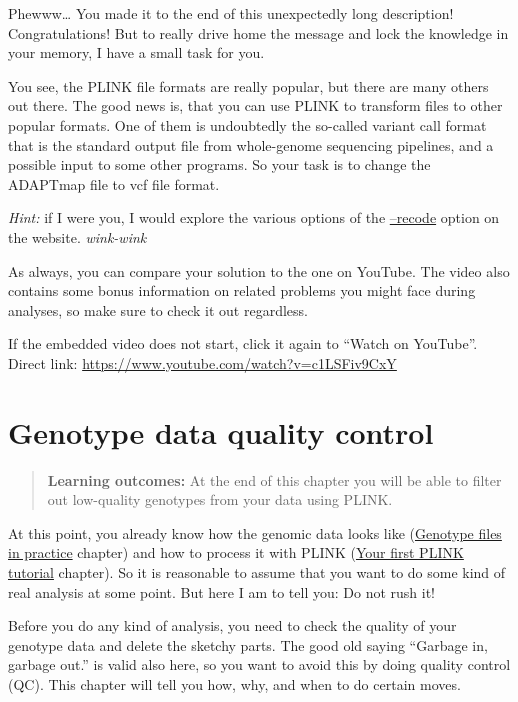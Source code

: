 \documentclass[]{book}
\begin{document}
Phewww\ldots{} You made it to the end of this unexpectedly long
description! Congratulations! But to really drive home the message and
lock the knowledge in your memory, I have a small task for you.

You see, the PLINK file formats are really popular, but there are many
others out there. The good news is, that you can use PLINK to transform
files to other popular formats. One of them is undoubtedly the so-called
variant call format that is the standard output file from whole-genome
sequencing pipelines, and a possible input to some other programs. So
your task is to change the ADAPTmap file to vcf file format.

\emph{Hint:} if I were you, I would explore the various options of the
\href{https://www.cog-genomics.org/plink/1.9/data\#recode}{--recode}
option on the website. \emph{wink-wink}

As always, you can compare your solution to the one on YouTube. The
video also contains some bonus information on related problems you might
face during analyses, so make sure to check it out regardless.

If the embedded video does not start, click it again to ``Watch on
YouTube''. Direct link:
\url{https://www.youtube.com/watch?v=c1LSFiv9CxY}

\hypertarget{genotype-data-quality-control}{\chapter{Genotype data
quality control}\label{genotype-data-quality-control}}

\begin{quote}
\textbf{Learning outcomes:} At the end of this chapter you will be able
to filter out low-quality genotypes from your data using PLINK.
\end{quote}

At this point, you already know how the genomic data looks like
(\protect\hyperlink{genotype-files-in-practice}{Genotype files in
practice} chapter) and how to process it with PLINK
(\protect\hyperlink{your-first-plink-tutorial}{Your first PLINK
tutorial} chapter). So it is reasonable to assume that you want to do
some kind of real analysis at some point. But here I am to tell you: Do
not rush it!

Before you do any kind of analysis, you need to check the quality of
your genotype data and delete the sketchy parts. The good old saying
``Garbage in, garbage out.'' is valid also here, so you want to avoid
this by doing quality control (QC). This chapter will tell you how, why,
and when to do certain moves.
\end{document}
